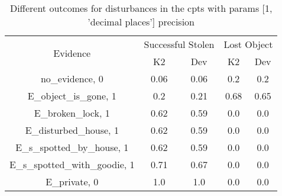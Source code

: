 \begin{table}\begin{tabular}{c|cc|cc}\toprule\multirow{2}{*}{Evidence} & \multicolumn{2}{c}{Successful Stolen} & \multicolumn{2}{c}{Lost Object} \\& {K2} & {Dev} & {K2} & {Dev} \\\midrule
no\_evidence, 0 & 0.06&0.06&0.2&0.2\\E\_object\_is\_gone, 1 & \cellcolor{Bittersweet}0.2&\cellcolor{Bittersweet}0.21&\cellcolor{Bittersweet}0.68&\cellcolor{Bittersweet}0.65\\E\_broken\_lock, 1 & \cellcolor{Bittersweet}0.62&\cellcolor{Bittersweet}0.59&0.0&0.0\\E\_disturbed\_house, 1 & \cellcolor{Bittersweet}0.62&\cellcolor{Bittersweet}0.59&0.0&0.0\\E\_s\_spotted\_by\_house, 1 & \cellcolor{Bittersweet}0.62&\cellcolor{Bittersweet}0.59&0.0&0.0\\E\_s\_spotted\_with\_goodie, 1 & \cellcolor{Bittersweet}0.71&\cellcolor{Bittersweet}0.67&0.0&0.0\\E\_private, 0 & 1.0&1.0&0.0&0.0\\\bottomrule\end{tabular}\caption{Different outcomes for disturbances in the cpts with params [1, 'decimal places'] precision}\end{table}